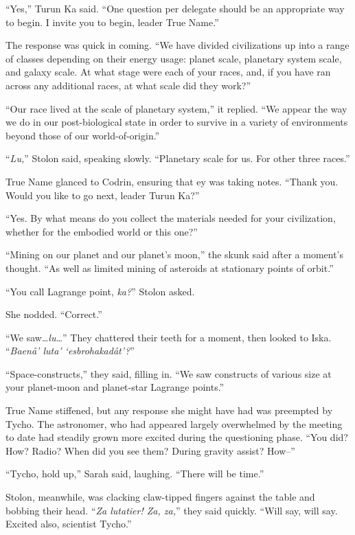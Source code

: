 ``Yes,'' Turun Ka said. ``One question per delegate should be an appropriate way to begin. I invite you to begin, leader True Name.''

The response was quick in coming. ``We have divided civilizations up into a range of classes depending on their energy usage: planet scale, planetary system scale, and galaxy scale. At what stage were each of your races, and, if you have ran across any additional races, at what scale did they work?''

``Our race lived at the scale of planetary system,'' it replied. ``We appear the way we do in our post-biological state in order to survive in a variety of environments beyond those of our world-of-origin.''

``\emph{Lu,}'' Stolon said, speaking slowly. ``Planetary scale for us. For other three races.''

True Name glanced to Codrin, ensuring that ey was taking notes. ``Thank you. Would you like to go next, leader Turun Ka?''

``Yes. By what means do you collect the materials needed for your civilization, whether for the embodied world or this one?''

``Mining on our planet and our planet's moon,'' the skunk said after a moment's thought. ``As well as limited mining of asteroids at stationary points of orbit.''

``You call Lagrange point, \emph{ka?}'' Stolon asked.

She nodded. ``Correct.''

``We saw\ldots{}\emph{lu\ldots{}}'' They chattered their teeth for a moment, then looked to Iska. ``\emph{Baenå' luta' `esbrohakadåt'?}''

``Space-constructs,'' they said, filling in. ``We saw constructs of various size at your planet-moon and planet-star Lagrange points.''

True Name stiffened, but any response she might have had was preempted by Tycho. The astronomer, who had appeared largely overwhelmed by the meeting to date had steadily grown more excited during the questioning phase. ``You did? How? Radio? When did you see them? During gravity assist? How--''

``Tycho, hold up,'' Sarah said, laughing. ``There will be time.''

Stolon, meanwhile, was clacking claw-tipped fingers against the table and bobbing their head. ``\emph{Za lutatier! Za, za,}'' they said quickly. ``Will say, will say. Excited also, scientist Tycho.''

